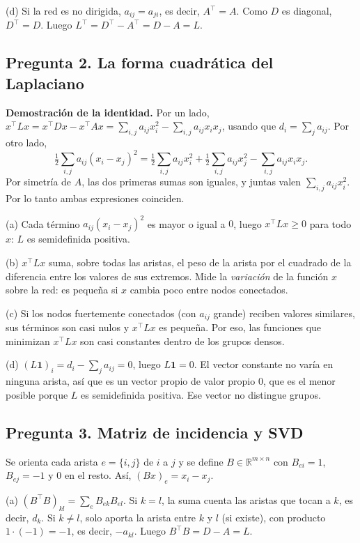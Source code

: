 \documentclass[11pt,a4paper]{article}
\newcommand{\uno}{\mathbf{1}}
\begin{document}
(d) Si la red es no dirigida, $a_{ij}=a_{ji}$, es decir, $A^\top=A$. Como $D$ es diagonal, $D^\top=D$. Luego $L^\top=D^\top-A^\top=D-A=L$.

\subsection{Pregunta 2. La forma cuadrática del Laplaciano}

\textbf{Demostración de la identidad.} Por un lado, $x^\top Lx=x^\top Dx-x^\top Ax=\sum_{i,j}a_{ij}x_i^2-\sum_{i,j}a_{ij}x_ix_j$, usando que $d_i=\sum_ja_{ij}$. Por otro lado,
\[
\tfrac12\sum_{i,j}a_{ij}(x_i-x_j)^2=\tfrac12\sum_{i,j}a_{ij}x_i^2+\tfrac12\sum_{i,j}a_{ij}x_j^2-\sum_{i,j}a_{ij}x_ix_j .
\]
Por simetría de $A$, las dos primeras sumas son iguales, y juntas valen $\sum_{i,j}a_{ij}x_i^2$. Por lo tanto ambas expresiones coinciden.

(a) Cada término $a_{ij}(x_i-x_j)^2$ es mayor o igual a $0$, luego $x^\top Lx\ge0$ para todo $x$: $L$ es semidefinida positiva.

(b) $x^\top Lx$ suma, sobre todas las aristas, el peso de la arista por el cuadrado de la diferencia entre los valores de sus extremos. Mide la \emph{variación} de la función $x$ sobre la red: es pequeña si $x$ cambia poco entre nodos conectados.

(c) Si los nodos fuertemente conectados (con $a_{ij}$ grande) reciben valores similares, sus términos son casi nulos y $x^\top Lx$ es pequeña. Por eso, las funciones que minimizan $x^\top Lx$ son casi constantes dentro de los grupos densos.

(d) $(L\uno)_i=d_i-\sum_ja_{ij}=0$, luego $L\uno=0$. El vector constante no varía en ninguna arista, así que es un vector propio de valor propio $0$, que es el menor posible porque $L$ es semidefinida positiva. Ese vector no distingue grupos.

\subsection{Pregunta 3. Matriz de incidencia y SVD}

Se orienta cada arista $e=\{i,j\}$ de $i$ a $j$ y se define $B\in\mathbb{R}^{m\times n}$ con $B_{ei}=1$, $B_{ej}=-1$ y $0$ en el resto. Así, $(Bx)_e=x_i-x_j$.

(a) $(B^\top B)_{kl}=\sum_eB_{ek}B_{el}$. Si $k=l$, la suma cuenta las aristas que tocan a $k$, es decir, $d_k$. Si $k\neq l$, solo aporta la arista entre $k$ y $l$ (si existe), con producto $1\cdot(-1)=-1$, es decir, $-a_{kl}$. Luego $B^\top B=D-A=L$.
\end{document}
